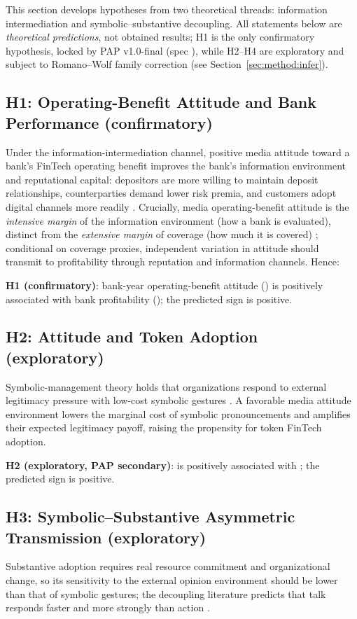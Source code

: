This section develops hypotheses from two theoretical threads:
information intermediation and symbolic--substantive decoupling. All
statements below are \emph{theoretical predictions}, not obtained
results; H1 is the only confirmatory hypothesis, locked by PAP
v1.0-final (spec ), while H2--H4
are exploratory and subject to Romano--Wolf family correction (see
Section~\ref{sec:method:infer}).

\subsection{H1: Operating-Benefit Attitude and Bank Performance (confirmatory)}
Under the information-intermediation channel, positive media attitude
toward a bank's FinTech operating benefit improves the bank's
information environment and reputational capital: depositors are more
willing to maintain deposit relationships, counterparties demand lower
risk premia, and customers adopt digital channels more readily
\parencite{tetlock2007content,fang2024mediasentiment}. Crucially, media
operating-benefit attitude is the \emph{intensive margin} of the
information environment (how a bank is evaluated), distinct from the
\emph{extensive margin} of coverage (how much it is covered)
\parencite{fang2009media}; conditional on coverage proxies, independent
variation in attitude should transmit to profitability through
reputation and information channels. Hence:

\textbf{H1 (confirmatory)}: bank-year operating-benefit attitude
() is positively associated with bank
profitability (); the predicted sign is positive.

\subsection{H2: Attitude and Token Adoption (exploratory)}
Symbolic-management theory holds that organizations respond to external
legitimacy pressure with low-cost symbolic gestures
\parencite{westphal1994substance,fiss2006symbolic}. A favorable media
attitude environment lowers the marginal cost of symbolic
pronouncements and amplifies their expected legitimacy payoff, raising
the propensity for token FinTech adoption.

\textbf{H2 (exploratory, PAP secondary)}:  is
positively associated with ; the predicted
sign is positive.

\subsection{H3: Symbolic--Substantive Asymmetric Transmission (exploratory)}
Substantive adoption requires real resource commitment and
organizational change, so its sensitivity to the external opinion
environment should be lower than that of symbolic gestures; the
decoupling literature predicts that talk responds faster and more
strongly than action \parencite{kim2015greenwash,duchin2025greenwashing}.

